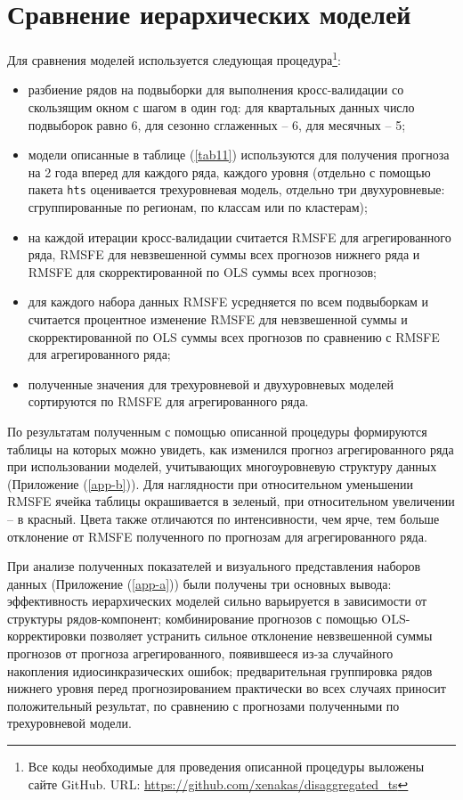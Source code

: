 \documentclass[12pt,a4paper, oneside]{extreport}
\begin{document}
\section{Сравнение иерархических моделей}

Для сравнения моделей используется следующая процедура\footnote{Все коды необходимые для проведения описанной процедуры выложены сайте GitHub. URL: \url{https://github.com/xenakas/disaggregated_ts}  }: 

\begin{itemize}
	\item разбиение рядов на подвыборки для выполнения кросс-валидации со скользящим окном с шагом в один год: для квартальных данных число подвыборок равно 6, для сезонно сглаженных -- 6, для месячных -- 5;
	\item модели описанные в таблице (\ref{tab11}) используются для получения прогноза на 2 года вперед для каждого ряда, каждого уровня  (отдельно с помощью пакета \texttt{hts} оценивается   трехуровневая модель,  отдельно три двухуровневые: сгруппированные по регионам, по классам или по кластерам);
	\item на каждой итерации кросс-валидации считается RMSFE для агрегированного ряда, RMSFE для невзвешенной суммы всех прогнозов нижнего ряда и RMSFE для скорректированной по OLS суммы всех прогнозов;
	\item для каждого набора данных RMSFE усредняется по  всем подвыборкам и считается процентное изменение  RMSFE для невзвешенной суммы и скорректированной по OLS суммы всех прогнозов по сравнению с RMSFE для агрегированного ряда;
	\item полученные значения для трехуровневой и двухуровневых моделей сортируются по  RMSFE   для агрегированного ряда.
\end{itemize}


По результатам полученным с помощью   описанной процедуры формируются таблицы на которых можно  увидеть, как изменился прогноз агрегированного ряда при использовании моделей, учитывающих многоуровневую  структуру данных (Приложение (\ref{app-b})). Для наглядности при относительном уменьшении RMSFE ячейка таблицы окрашивается в зеленый, при относительном увеличении -- в красный. Цвета также отличаются по интенсивности, чем ярче, тем больше отклонение от RMSFE полученного по прогнозам для агрегированного ряда.

При анализе  полученных показателей  и визуального  представления  наборов данных (Приложение (\ref{app-a}))  были получены три основных  вывода:
эффективность иерархических  моделей  сильно варьируется в зависимости от структуры рядов-компонент;
комбинирование прогнозов с помощью OLS-корректировки  позволяет устранить сильное отклонение невзвешенной суммы прогнозов от прогноза агрегированного, появившееся из-за случайного накопления идиосинкразических ошибок;
предварительная группировка рядов нижнего уровня перед прогнозированием практически во всех случаях приносит положительный результат, по сравнению с прогнозами полученными по трехуровневой модели. 
\end{document}
